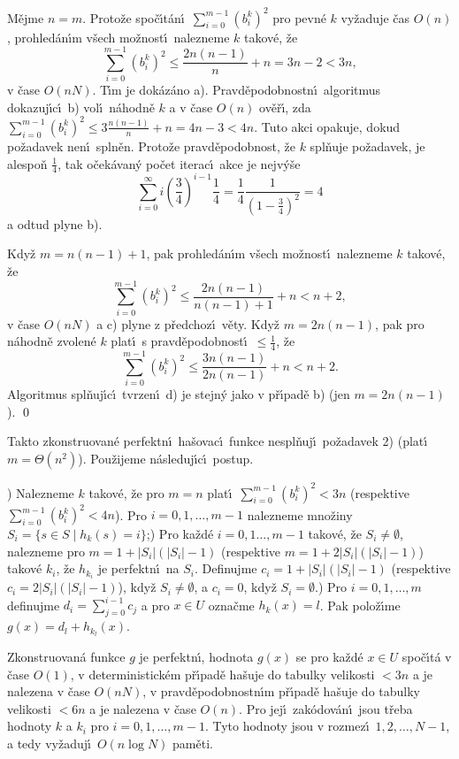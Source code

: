 \documentclass[a4paper,12pt]{article}
\begin{document}
M\v ejme $n=m$. Proto\v ze spo\v c\'\i t\'an\'\i\ 
$\sum_{i=0}^{m-1}(b_i^k)^2$ pro pevn\'e $k$ vy\v zaduje \v cas $O
(n)$, prohled\'an\'\i m 
v\v sech mo\v znost\'\i\ nalez\-ne\-me $k$ takov\'e, \v ze 
$$\sum_{i=0}^{m-1}(b_i^k)^2\le\frac {2n(n-1)}n+n=3n-2<3n,$$
v \v case $O(nN)$. T\'\i m je 
dok\'az\'ano a). Pravd\v epodobnostn\'\i\ algoritmus dokazuj\'\i c\'\i\ b) vol\'\i\ 
n\'ahodn\v e $k$ a v \v case $O(n)$ ov\v e\v r\'\i , zda 
$\sum_{i=0}^{m-1}(b_i^k)^2\le 3\frac {n(n-1)}n+n=4n-3<4n$. Tuto akci opakuje, dokud 
po\v zadavek nen\'\i\ spln\v en. Proto\v ze pravd\v epodobnost, \v ze $
k$ spl\v nuje 
po\v zadavek, je alespo\v n $\frac 14$, tak o\v cek\'avan\'y po\v cet ite\-rac\'\i\ 
akce je nejv\'y\v se 
$$\sum_{i=0}^{\infty}i(\frac 34)^{i-1}\frac 14=\frac 14\frac 1{(1
-\frac 34)^2}=4$$
a odtud plyne b). 

\flushpar Kdy\v z $m=n(n-1)+1$, pak prohled\'an\'\i m v\v sech mo\v znost\'\i\ 
nalezne\-me $k$ takov\'e, \v ze 
$$\sum_{i=0}^{m-1}(b_i^k)^2\le\frac {2n(n-1)}{n(n-1)+1}+n<n+2,$$
 v 
\v case $O(nN)$ a c) plyne z p\v redchoz\'\i\ v\v ety. Kdy\v z 
$m=2n(n-1)$, pak pro n\'ahodn\v e zvolen\'e $k$ plat\'\i\ s 
pravd\v epodobnost\'\i\ $\le\frac 14$, \v ze 
$$\sum_{i=0}^{m-1}(b_i^k)^2\le\frac {3n(n-1)}{2n(n-1)}+n<n+2.$$
Algoritmus spl\v nuj\'\i c\'\i\ tvrzen\'\i\ d) je stejn\'y jako 
v p\v r\'\i pad\v e b) (jen $m=2n(n-1)$). \qed
\enddemo

\flushpar Takto zkonstruovan\'e perfektn\'\i\ ha\v sovac\'\i\ funkce 
nespl\v nuj\'\i\ po\v za\-davek 2) (plat\'\i\ $m=\Theta (n^2)$).  Pou\v zijeme n\'asleduj\'\i c\'\i\ 
postup. 
\medskip

\flushpar1) Nalezneme $k$ takov\'e, \v ze pro $m=n$ plat\'\i\ 
$\sum_{i=0}^{m-1}(b_i^k)^2<3n$ (respektive $\sum_{i=0}^{m-1}(b_i^
k)^2<4n$).  Pro 
$i=0,1,\dots,m-1$ nalezneme mno\v ziny 
$S_i=\{s\in S\mid h_k(s)=i\}$;\newline 
2) Pro ka\v zd\'e $i=0,1\dots,m-1$ takov\'e, \v ze $S_i\ne\emptyset$, 
nalezneme pro $m=1+|S_i|(|S_i|-1)$ (respektive $m=1+2|S_i|(|S_i|-
1)$) 
takov\'e $k_i$, \v ze $h_{k_i}$ je perfektn\'\i\ na $S_i$. Definujme 
$c_i=1+|S_i|(|S_i|-1)$ (respektive $c_i=2|S_i|(|S_i|-1)$), kdy\v z 
$S_i\ne\emptyset$, a $c_i=0$, kdy\v z 
$S_i=\emptyset$.\newline 
3) Pro $i=0,1,\dots,m$ definujme $d_i=\sum_{j=0}^{i-1}c_j$ a pro $
x\in U$ 
ozna\v cme $h_k(x)=l$. Pak polo\v z\'\i me $g(x)=d_l+h_{k_l}(x)$.

\proclaim{V\v eta}Zkonstruovan\'a funkce $g$ je perfektn\'\i , 
hodnota $g(x)$ se pro ka\v zd\'e $x\in U$ spo\v c\'\i t\'a v \v case $
O(1)$, 
v deterministick\'em p\v r\'\i pa\-d\v e ha\v suje do tabulky velikosti 
$<3n$ a je nalezena v \v case $O(nN)$, v pravd\v epodobnostn\'\i m 
p\v r\'\i pa\-d\v e ha\v suje do tabulky velikosti $<6n$ a je nalezena 
v \v case $O(n)$. Pro jej\'\i\ zak\'odov\'an\'\i\ jsou t\v reba hodnoty $
k$ a 
$k_i$ pro $i=0,1,\dots,m-1$. Tyto hodnoty jsou v rozmez\'\i\ 
$1,2,\dots,N-1$, a tedy vy\v zaduj\'\i\ $O(n\log N)$ pam\v eti.
\endproclaim
\end{document}
